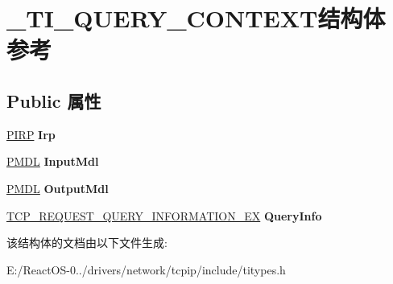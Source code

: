 \hypertarget{struct___t_i___q_u_e_r_y___c_o_n_t_e_x_t}{}\section{\+\_\+\+T\+I\+\_\+\+Q\+U\+E\+R\+Y\+\_\+\+C\+O\+N\+T\+E\+X\+T结构体 参考}
\label{struct___t_i___q_u_e_r_y___c_o_n_t_e_x_t}
\subsection*{Public 属性}
\begin{DoxyCompactItemize}
\item 
\mbox{\label{struct___t_i___q_u_e_r_y___c_o_n_t_e_x_t_a9f474a7154717f15002516136fd4bb6f}} 
\hyperlink{interfacevoid}{P\+I\+RP} {\bfseries Irp}
\item 
\mbox{\label{struct___t_i___q_u_e_r_y___c_o_n_t_e_x_t_a9c66ba0dd1cef75e86da645b5ec6cf3f}} 
\hyperlink{interfacevoid}{P\+M\+DL} {\bfseries Input\+Mdl}
\item 
\mbox{\label{struct___t_i___q_u_e_r_y___c_o_n_t_e_x_t_a31bf57a1247cc91af0356a091beafb11}} 
\hyperlink{interfacevoid}{P\+M\+DL} {\bfseries Output\+Mdl}
\item 
\mbox{\label{struct___t_i___q_u_e_r_y___c_o_n_t_e_x_t_a9f032c9c554ef1c41fecc62999b71d4e}} 
\hyperlink{struct___t_c_p___r_e_q_u_e_s_t___q_u_e_r_y___i_n_f_o_r_m_a_t_i_o_n___e_x}{T\+C\+P\+\_\+\+R\+E\+Q\+U\+E\+S\+T\+\_\+\+Q\+U\+E\+R\+Y\+\_\+\+I\+N\+F\+O\+R\+M\+A\+T\+I\+O\+N\+\_\+\+EX} {\bfseries Query\+Info}
\end{DoxyCompactItemize}


该结构体的文档由以下文件生成\+:\begin{DoxyCompactItemize}
\item 
E\+:/\+React\+O\+S-\/0../drivers/network/tcpip/include/titypes.\+h\end{DoxyCompactItemize}
